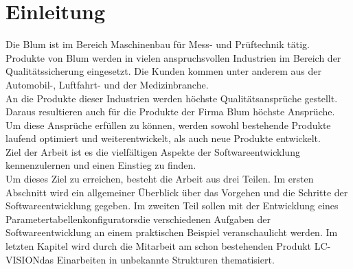 \documentclass[12pt,a4paper]{article}
\begin{document}
\section{Einleitung}
Die \ac{Blum} ist im Bereich Maschinenbau für Mess- und Prüftechnik tätig.\\
Produkte von \ac{Blum} werden in vielen anspruchsvollen Industrien im Bereich der Qualitätssicherung eingesetzt. Die Kunden kommen unter anderem aus der Automobil-, Luftfahrt- und der Medizinbranche. \\
An die Produkte dieser Industrien werden höchste Qualitätsansprüche gestellt. Daraus resultieren auch für die Produkte der Firma \ac{Blum} höchste Ansprüche. \\
Um diese Ansprüche erfüllen zu können, werden sowohl bestehende Produkte laufend optimiert und weiterentwickelt, als auch neue Produkte entwickelt. \\
Ziel der Arbeit ist es die vielfältigen Aspekte der Softwareentwicklung kennenzulernen und einen Einstieg zu finden.\\
Um dieses Ziel zu erreichen, besteht die Arbeit aus drei Teilen. Im ersten Abschnitt wird ein allgemeiner Überblick über das Vorgehen und die Schritte der Softwareentwicklung gegeben. Im zweiten Teil sollen mit der Entwicklung eines \glqq Parametertabellenkonfigurators\grqq\space die verschiedenen Aufgaben der Softwareentwicklung an einem praktischen Beispiel veranschaulicht werden.
Im letzten Kapitel wird durch die Mitarbeit am schon bestehenden Produkt \glqq LC-VISION\grqq\space das Einarbeiten in unbekannte Strukturen thematisiert. 
\newpage   



\newpage


\end{document}
